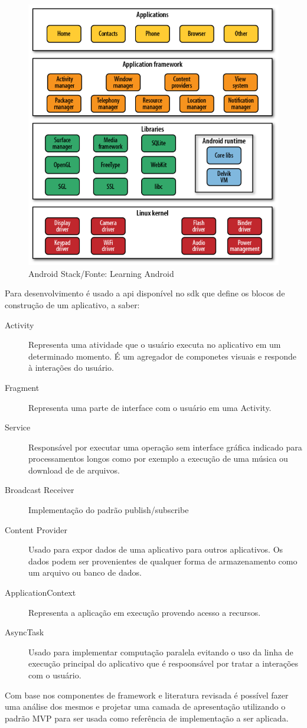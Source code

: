 \begin{figure}[h]
	\centering
	\includegraphics[scale=0.5]{img/android_stack.png}
	\caption{Android Stack/Fonte: Learning Android}
	\label{android_stack}
\end{figure}

Para desenvolvimento é usado a api disponível no sdk que define
os blocos de construção de um aplicativo, a saber:

\begin{description}
  \item[Activity] Representa uma atividade que o usuário executa no aplicativo
  em um determinado momento. É um agregador de componetes visuais e responde à
  interações do usuário.
  \item[Fragment] Representa uma parte de interface com o usuário em uma
  Activity.
  \item[Service] Responsável por executar uma operação sem interface gráfica
  indicado para processamentos longos como por exemplo a execução de uma música
  ou download de de arquivos.
  \item[Broadcast Receiver] Implementação do padrão publish/subscribe 
  \item[Content Provider] Usado para expor dados de uma aplicativo para outros
  aplicativos. Os dados podem ser provenientes de qualquer forma de
  armazenamento como um arquivo ou banco de dados.
  \item[ApplicationContext] Representa a aplicação em execução provendo acesso
  a recursos.
  \item[AsyncTask] Usado para implementar computação paralela evitando o uso da
  linha de execução principal do aplicativo que é respoonsável por tratar a
  interações com o usuário.
\end{description}

Com base nos componentes de framework e literatura revisada é possível fazer
uma análise dos mesmos e projetar uma camada de apresentação utilizando o padrão
MVP para ser usada como referência de implementação a ser aplicada.